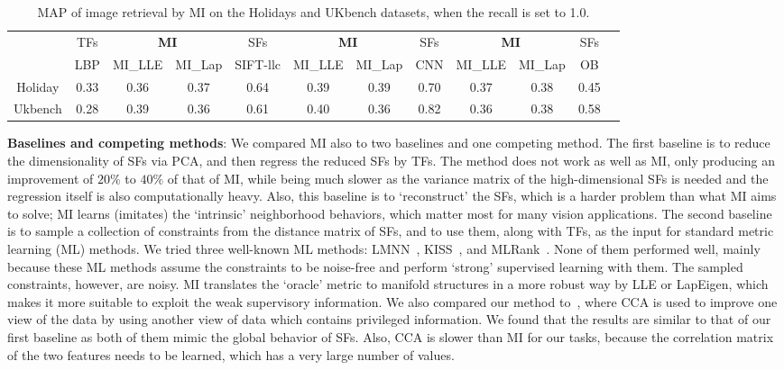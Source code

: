 \documentclass[10pt,twocolumn,letterpaper]{article}
\begin{document}

\begin{table}[!tb]
  \centering \small \setlength{\tabcolsep}{.60em} 
\caption{MAP of image retrieval by MI on the Holidays and UKbench datasets, when the recall is set to 1.0.}
      \begin{tabular}{c|c|ccc|ccc|cccc}
   & TFs & \multicolumn{2}{c}{\textbf{MI}} & SFs & \multicolumn{2}{c}{ \textbf{MI} } & SFs & \multicolumn{2}{c}{ \textbf{MI}} & SFs  \\   
    & LBP & MI\_LLE & MI\_Lap & SIFT-llc  & MI\_LLE & MI\_Lap & CNN &  MI\_LLE & MI\_Lap & OB     \\   \hline  
    Holiday & 0.33  & 0.36  & 0.37  & 0.64   & 0.39  & 0.39  & 0.70  & 0.37  & 0.38  & 0.45 \\ 
    Ukbench & 0.28  & 0.39  & 0.36  & 0.61   & 0.40  & 0.36  & 0.82  & 0.36  & 0.38  & 0.58\\   
   \end{tabular}
    \label{tab:retrieval} 
\vspace{-3mm}
\end{table}
 
 
\textbf{Baselines and competing methods}: We compared MI also to two
baselines and one competing method. The first baseline is to reduce
the dimensionality of SFs via PCA, and then regress the reduced SFs by
TFs. The method does not work as well as MI, only producing
an improvement of $20\%$ to $40\%$ of that of MI, while being much slower
as the variance matrix of the high-dimensional SFs is needed and the
regression itself is also computationally heavy. Also, this baseline is
to `reconstruct' the SFs, which is a harder problem than what MI aims to solve; 
MI learns (imitates) the `intrinsic' neighborhood behaviors, which matter most for many vision applications. The
second baseline is to sample a collection of constraints from the
distance matrix of SFs, and to use them, along with TFs, as the input
for standard metric learning (ML) methods. We tried three well-known
ML methods: LMNN~\cite{max:margin:knn},
KISS~\cite{large:scale:metric:cvpr12}, and
MLRank~\cite{mlrank:10}. None of them performed well, mainly
because these ML methods assume the constraints to be noise-free and
perform `strong' supervised learning with them. The sampled
constraints, however, are noisy. MI translates the `oracle' metric to
manifold structures in a more robust way by LLE or LapEigen, which
makes it more suitable to exploit the weak supervisory information.
We also compared our method to~\cite{IQ:cvpr11}, where CCA
is used to improve one view of the data by using another view of data
which contains privileged information. We found that the results are
similar to that of our first baseline as both of them mimic the global
behavior of SFs. Also, CCA is slower than MI for our tasks, because the correlation
matrix of the two features needs to be learned, which has a very large
number of values.
\end{document}
